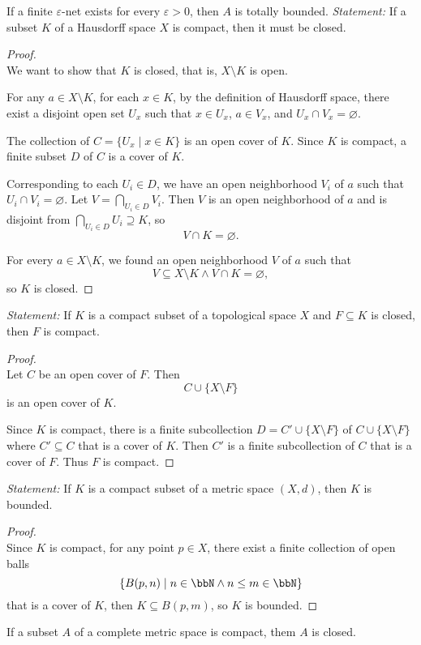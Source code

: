 \documentclass[a4paper,12pt]{article}
\begin{document}
If a finite $\varepsilon$-net exists for every $\varepsilon>0$, then $A$ is totally bounded.
\textit{Statement:} If a subset $K$ of a Hausdorff space $X$ is compact, then it must be closed.

\begin{proof}\mbox{}\\
We want to show that $K$ is closed, that is, $X\setminus K$ is open.

For any $a\in X\setminus K$, for each $x\in K$, by the definition of Hausdorff space, there exist a disjoint open set $U_x$ such that $x\in U_x$, $a\in V_x$, and $U_x\cap V_x=\varnothing$.

The collection of $C=\{U_x\mid x\in K\}$ is an open cover of $K$. Since $K$ is compact, a finite subset $D$ of $C$ is a cover of $K$.

Corresponding to each $U_i\in D$, we have an open neighborhood $V_i$ of $a$ such that $U_i\cap V_i=\varnothing$. Let $V=\bigcap_{U_i\in D}V_i$. Then $V$ is an open neighborhood of $a$ and is disjoint from $\bigcap_{U_i\in D}U_i\supseteq K$, so
\[V\cap K=\varnothing.\]

For every $a\in X\setminus K$, we found an open neighborhood $V$ of $a$ such that
\[V\subseteq X\setminus K\land V\cap K=\varnothing,\]
so $K$ is closed.
\end{proof}
\textit{Statement:} If $K$ is a compact subset of a topological space $X$ and $F\subseteq K$ is closed, then $F$ is compact.

\begin{proof}\mbox{}\\
Let $C$ be an open cover of $F$. Then
\[C\cup\{X\setminus F\}\]
is an open cover of $K$.

Since $K$ is compact, there is a finite subcollection $D=C'\cup\{X\setminus F\}$ of $C\cup\{X\setminus F\}$ where $C'\subseteq C$ that is a cover of $K$. Then $C'$ is a finite subcollection of $C$ that is a cover of $F$. Thus $F$ is compact.
\end{proof}
\textit{Statement:} If $K$ is a compact subset of a metric space $(X,d)$, then $K$ is bounded.

\begin{proof}\mbox{}\\
Since $K$ is compact, for any point $p\in X$, there exist a finite collection of open balls
\[\{B(p,n)\mid n\in\bbN\land n\leq m\in\bbN\}\]
that is a cover of $K$, then $K\subseteq B(p,m)$, so $K$ is bounded.
\end{proof}
 If a subset $A$ of a complete metric space is compact, them $A$ is closed.
\end{document}
